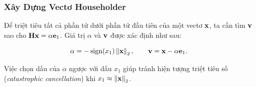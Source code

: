 \subsubsection{Xây Dựng Vectơ Householder}

Để triệt tiêu tất cả phần tử dưới phần tử đầu tiên của một vectơ $\mathbf{x}$,
ta cần tìm $\mathbf{v}$ sao cho $\mathbf{H}\mathbf{x} = \alpha \mathbf{e}_1$. Giá trị $\alpha$
và $\mathbf{v}$ được xác định như sau:

\begin{equation}
    \alpha = -\operatorname{sign}(x_1)\left\lVert\mathbf{x}\right\rVert_2,
    \qquad
    \mathbf{v} = \mathbf{x} - \alpha\mathbf{e}_1.
    \label{eq:householder_v}
\end{equation}

Việc chọn dấu của $\alpha$ ngược với dấu $x_1$ giúp tránh hiện tượng triệt tiêu số
(\textit{catastrophic cancellation}) khi $x_1 \approx \left\lVert\mathbf{x}\right\rVert_2$.

